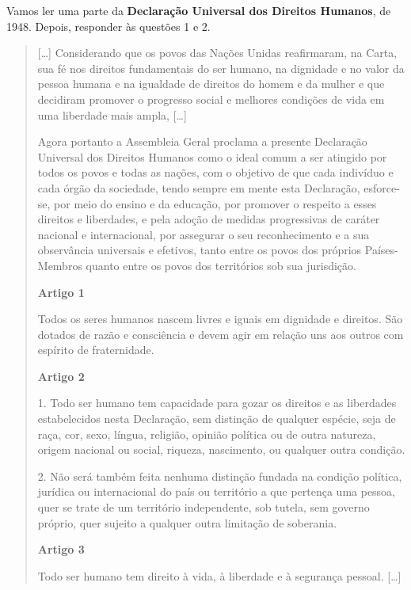 
Vamos ler uma parte da \textbf{Declaração Universal dos Direitos Humanos}, de 1948. Depois, responder às questões 1 e 2.

\begin{quote}
{[}\ldots{}{]}
Considerando que os povos das Nações Unidas reafirmaram, na Carta, sua
fé nos direitos fundamentais do ser humano, na dignidade e no valor da
pessoa humana e na igualdade de direitos do homem e da mulher e que
decidiram promover o progresso social e melhores condições de vida em
uma liberdade mais ampla, {[}\ldots{}{]}

Agora portanto a Assembleia Geral proclama a presente Declaração
Universal dos Direitos Humanos como o ideal comum a ser atingido por
todos os povos e todas as nações, com o objetivo de que cada indivíduo e
cada órgão da sociedade, tendo sempre em mente esta Declaração,
esforce-se, por meio do ensino e da educação, por promover o respeito a
esses direitos e liberdades, e pela adoção de medidas progressivas de
caráter nacional e internacional, por assegurar o seu reconhecimento e a
sua observância universais e efetivos, tanto entre os povos dos próprios
Países-Membros quanto entre os povos dos territórios sob sua jurisdição.

\textbf{Artigo 1}

Todos os seres humanos nascem livres e iguais em dignidade e direitos.
São dotados de razão e consciência e devem agir em relação uns aos
outros com espírito de fraternidade.

\textbf{Artigo 2}

1. Todo ser humano tem capacidade para gozar os direitos e as liberdades
estabelecidos nesta Declaração, sem distinção de qualquer espécie, seja
de raça, cor, sexo, língua, religião, opinião política ou de outra
natureza, origem nacional ou social, riqueza, nascimento, ou qualquer
outra condição.

2. Não será também feita nenhuma distinção fundada na condição política,
jurídica ou internacional do país ou território a que pertença uma
pessoa, quer se trate de um território independente, sob tutela, sem
governo próprio, quer sujeito a qualquer outra limitação de soberania.

\textbf{Artigo 3}

Todo ser humano tem direito à vida, à liberdade e à segurança pessoal. {[}\ldots{}{]}

\end{quote}

